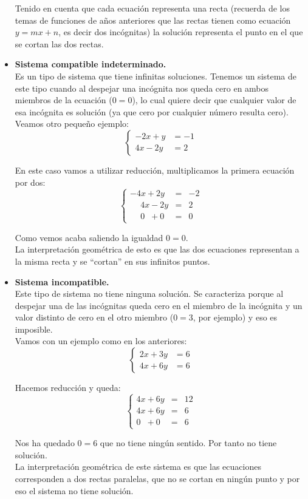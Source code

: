 \documentclass[a4paper,11pt,answers]{exam}
\begin{document}
\begin{itemize}
  Tenido en cuenta que cada ecuación representa una recta (recuerda de los temas de funciones
  de años anteriores que las rectas tienen como ecuación $y = mx +n$, es decir dos incógnitas) la
  solución representa el punto en el que se cortan las dos rectas.
\item \large{\textbf{Sistema compatible indeterminado.}}\\
  Es un tipo de sistema que tiene infinitas soluciones. Tenemos un sistema de este tipo
  cuando al despejar una incógnita nos queda cero en ambos miembros de la ecuación ($0 = 0$),
  lo cual quiere decir que cualquier valor de esa incógnita es solución (ya que cero por
  cualquier número resulta cero).\\
  Veamos otro pequeño ejemplo:
  \[
    \begin{cases}
      -2x + y & = -1\\
      4x - 2y &= 2
    \end{cases}\]
  \begin{solution}
    En este caso vamos a utilizar reducción, multiplicamos la primera ecuación por dos:
    \[\left\lbrace
        \begin{array}{llr}
          -4x + 2y & = &-2\\
          \phantom{-}4x - 2y &=&2\\
          \hline
          \phantom{-}0\phantom{x} + 0\phantom{y}&=&0
        \end{array}
      \right.\]
  \end{solution}
  Como vemos acaba saliendo la igualdad $0 = 0$.\\
  La interpretación geométrica de esto es que las dos ecuaciones representan a la misma recta y
  se ``cortan'' en sus infinitos puntos.
\item \large{\textbf{Sistema incompatible.}}\\
  Este tipo de sistema no tiene ninguna solución. Se caracteriza porque al despejar una de las
  incógnitas queda cero en el miembro de la incógnita y un valor distinto de cero en el otro
  miembro ($0=3$, por ejemplo) y eso es imposible.\\
  Vamos con un ejemplo como en los anteriores:
  \[
    \begin{cases}
      2x + 3y &=6\\
      4x + 6y &= 6
    \end{cases}\]
  \begin{solution}
    Hacemos reducción y queda:
    \[\left\lbrace
        \begin{array}{llr}
          4x + 6y & = &12\\
          4x + 6y &=&6\\
          \hline
          0\phantom{x} + 0\phantom{y}&=&6
        \end{array}
      \right.\]
  \end{solution}
  Nos ha quedado $0=6$ que no tiene ningún sentido. Por tanto no tiene solución.\\
  La interpretación geométrica de este sistema es que las ecuaciones corresponden a dos rectas
  paralelas, que no se cortan en ningún punto y por eso el sistema no tiene solución.
\end{itemize}
\end{document}
